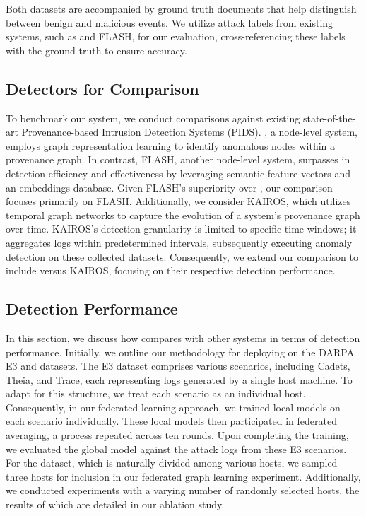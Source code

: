 Both datasets are accompanied by ground truth documents that help distinguish between benign and malicious events. We utilize attack labels from existing systems, such as \threatrace and FLASH, for our evaluation, cross-referencing these labels with the ground truth to ensure accuracy.

\subsection*{Detectors for Comparison}

To benchmark our system, we conduct comparisons against existing state-of-the-art Provenance-based Intrusion Detection Systems (PIDS). \threatrace, a node-level system, employs graph representation learning to identify anomalous nodes within a provenance graph. In contrast, FLASH, another node-level system, surpasses \threatrace in detection efficiency and effectiveness by leveraging semantic feature vectors and an embeddings database. Given FLASH's superiority over \threatrace, our comparison focuses primarily on FLASH. Additionally, we consider KAIROS, which utilizes temporal graph networks to capture the evolution of a system's provenance graph over time. KAIROS's detection granularity is limited to specific time windows; it aggregates logs within predetermined intervals, subsequently executing anomaly detection on these collected datasets. Consequently, we extend our comparison to include \Sys versus KAIROS, focusing on their respective detection performance.

 \subsection*{Detection Performance}

In this section, we discuss how \Sys compares with other systems in terms of detection performance. Initially, we outline our methodology for deploying \Sys on the DARPA E3 and \optc datasets. The E3 dataset comprises various scenarios, including Cadets, Theia, and Trace, each representing logs generated by a single host machine. To adapt \Sys for this structure, we treat each scenario as an individual host. Consequently, in our federated learning approach, we trained local \gnnshort models on each scenario individually. These local models then participated in federated averaging, a process repeated across ten rounds. Upon completing the training, we evaluated the global \gnnshort model against the attack logs from these E3 scenarios. For the \optc dataset, which is naturally divided among various hosts, we sampled three hosts for inclusion in our federated graph learning experiment. Additionally, we conducted experiments with a varying number of randomly selected hosts, the results of which are detailed in our ablation study.

